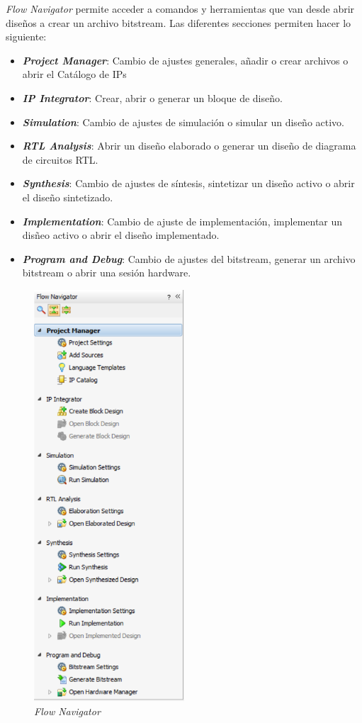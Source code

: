 \textit{Flow Navigator} permite acceder a comandos y herramientas que van desde abrir diseños a crear un archivo bitstream. Las 
diferentes secciones permiten hacer lo siguiente:
\begin{itemize}
    \item \textit{\textbf{Project Manager}}: Cambio de ajustes generales, añadir o crear archivos o abrir el Catálogo de IPs
    \item \textit{\textbf{IP Integrator}}: Crear, abrir o generar un bloque de diseño. 
    \item \textit{\textbf{Simulation}}: Cambio de ajustes de simulación o simular un diseño activo.
    \item \textit{\textbf{RTL Analysis}}: Abrir un diseño elaborado o generar un diseño de diagrama de circuitos RTL.
    \item \textit{\textbf{Synthesis}}: Cambio de ajustes de síntesis, sintetizar un diseño activo o abrir el diseño sintetizado.
    \item \textit{\textbf{Implementation}}: Cambio de ajuste de implementación, implementar un disñeo activo o abrir el diseño implementado.
    \item \textit{\textbf{Program and Debug}}: Cambio de ajustes del bitstream, generar un archivo bitstream o abrir una sesión hardware.
\end{itemize}

\begin{figure}[H]
    \centering
    \includegraphics[width = 0.5\textwidth]{imagenes/flownavigator.png}
    \caption{\textit{Flow Navigator}}\label{flownavigator}
\end{figure}

